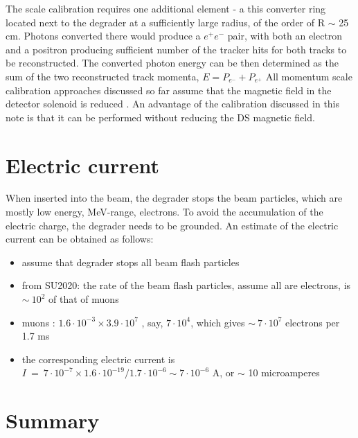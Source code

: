 \documentclass[12pt]{article}
\begin{document}
The scale calibration requires one additional element - a this converter ring located next
to the degrader at a sufficiently large radius, of the order of R $\sim$ 25 cm.
Photons converted there would produce a $e^+e^-$ pair, with both an electron and
a positron producing sufficient number of the tracker hits for both tracks
to be reconstructed. The converted photon energy can be then determined as the sum
of the two reconstructed track momenta, $E = P_{e^-} + P_{e^+}$ 
All momentum scale calibration approaches discussed so far assume that the magnetic field
in the detector solenoid is reduced \cite{MU2E_48630_PIPLUSENU}.
An advantage of the calibration discussed in this note is that it can be performed
without reducing the DS magnetic field.







\section{Electric current}
When inserted into the beam, the degrader stops the beam particles, which are
mostly low energy, MeV-range, electrons. To avoid the accumulation of the electric charge,
the degrader needs to be grounded. An estimate of the electric current can be obtained
as follows:
\begin{itemize}
\item
  assume that degrader stops all beam flash particles
\item
  from SU2020: the rate of the beam flash particles, assume all are electrons, is $\sim ~ 10^2$ of that of muons
\item
  muons : $1.6 \cdot 10^{-3} \times 3.9 \cdot 10^7$ , say, $7 \cdot 10^4$, which gives $\sim ~ 7 \cdot 10^7$ electrons per 1.7 ms
\item
  the corresponding electric current is $I ~=~ 7 \cdot 10^{-7} \times 1.6 \cdot 10^{-19} / {1.7 \cdot 10^{-6}} \sim 7 \cdot 10^{-6}$ A,
  or $\sim$ 10 microamperes
\end{itemize}



\section {Summary}
\end{document}
